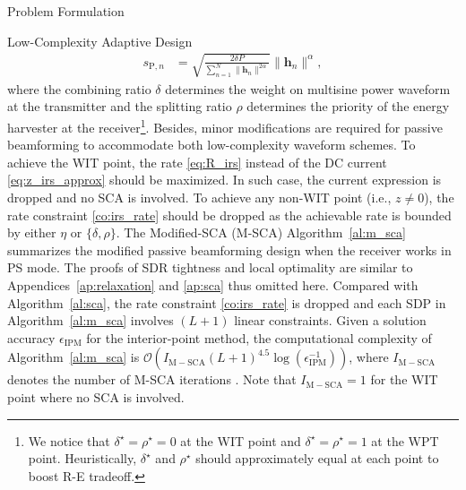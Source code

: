\documentclass[journal]{IEEEtran}
\begin{document}
\begin{section}{Problem Formulation}
\begin{subsection}{Low-Complexity Adaptive Design}
\begin{align}
				s_{\mathrm{P}, n} &= \sqrt{\frac{2 \delta P}{\sum_{n=1}^N \lVert{\boldsymbol{h}_n \rVert^{2 \alpha}}}}\lVert{\boldsymbol{h}_n}\rVert^\alpha, \label{eq:s_p}
			\end{align}
			where the combining ratio $\delta$ determines the weight on multisine power waveform at the transmitter and the splitting ratio $\rho$ determines the priority of the energy harvester at the receiver\footnote{We notice that $\delta^{\star}=\rho^{\star}=0$ at the WIT point and $\delta^{\star}=\rho^{\star}=1$ at the WPT point. Heuristically, $\delta^{\star}$ and $\rho^{\star}$ should approximately equal at each point to boost R-E tradeoff.}. Besides, minor modifications are required for passive beamforming to accommodate both low-complexity waveform schemes. To achieve the WIT point, the rate \eqref{eq:R_irs} instead of the DC current \eqref{eq:z_irs_approx} should be maximized. In such case, the current expression is dropped and no SCA is involved. To achieve any non-WIT point (i.e., $z \ne 0$), the rate constraint \eqref{co:irs_rate} should be dropped as the achievable rate is bounded by either $\eta$ or $\{\delta,\rho\}$. The Modified-SCA (M-SCA) Algorithm~\ref{al:m_sca} summarizes the modified passive beamforming design when the receiver works in PS mode. The proofs of SDR tightness and local optimality are similar to Appendices~\ref{ap:relaxation} and \ref{ap:sca} thus omitted here. Compared with Algorithm~\ref{al:sca}, the rate constraint \eqref{co:irs_rate} is dropped and each SDP in Algorithm~\ref{al:m_sca} involves $(L+1)$ linear constraints. Given a solution accuracy $\epsilon_{\mathrm{IPM}}$ for the interior-point method, the computational complexity of Algorithm~\ref{al:m_sca} is $\mathcal{O}\left(I_{\mathrm{M-SCA}}(L+1)^{4.5} \log(\epsilon_{\mathrm{IPM}}^{-1})\right)$, where $I_{\mathrm{M-SCA}}$ denotes the number of M-SCA iterations \cite{Luo2010}. Note that $I_{\mathrm{M-SCA}}=1$ for the WIT point where no SCA is involved.


\end{subsection}
\end{section}
\end{document}
